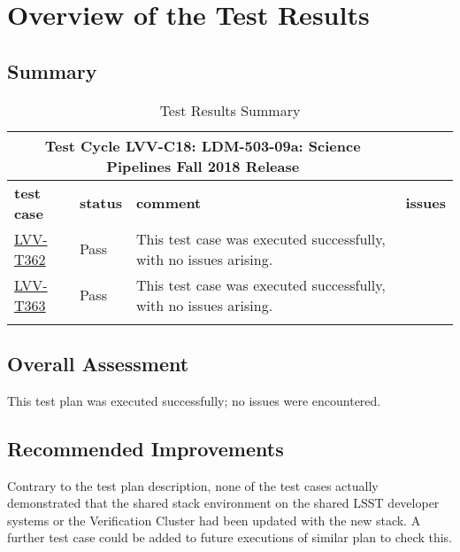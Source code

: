 \documentclass[DM,STR,toc]{lsstdoc}
\begin{document}
\newpage

\section{Overview of the Test Results}
\label{sect:overview}

\subsection{Summary}
\label{sect:summarytable}

\begin{longtable}{p{}p{}p{}p{}}
\toprule
  \multicolumn{3}{c}{ Test Cycle {\bf LVV-C18: LDM-503-09a: Science Pipelines Fall 2018 Release
 }} \\\hline
  {\bf \footnotesize test case} & {\bf \footnotesize status} & {\bf \footnotesize comment} & {\bf \footnotesize issues} \\\toprule
    \href{https://jira.lsstcorp.org/secure/Tests.jspa#/testCase/LVV-T362}{LVV-T362} 
    & Pass & This test case was executed successfully, with no issues arising.
 &
    \\\hline
    \href{https://jira.lsstcorp.org/secure/Tests.jspa#/testCase/LVV-T363}{LVV-T363} 
    & Pass & This test case was executed successfully, with no issues arising.
 &
    \\\hline

\caption{Test Results Summary}
\label{table:summary}
\end{longtable}

\subsection{Overall Assessment}
\label{sect:overallassessment}

This test plan was executed successfully; no issues were encountered.


\subsection{Recommended Improvements}
\label{sect:recommendations}

Contrary to the test plan description, none of the test cases actually
demonstrated that the shared stack environment on the shared LSST
developer systems or the Verification Cluster had been updated with the
new stack. A further test case could be added to future executions of
similar plan to check this.
\end{document}
